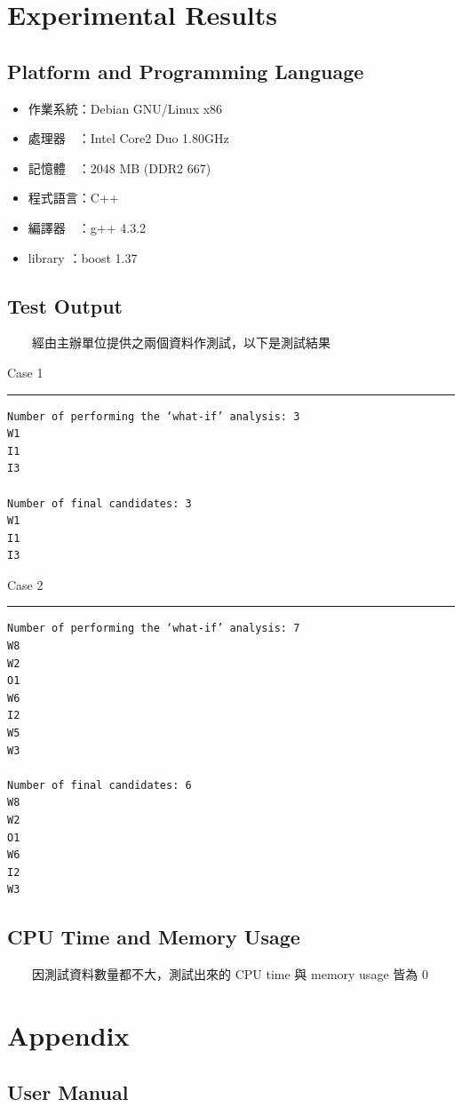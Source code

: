 \documentclass[12pt,a4paper]{article}
\begin{document}
\section{Experimental Results}

\subsection{Platform and Programming Language}

\begin{itemize}
\item 作業系統：Debian GNU/Linux x86
\item 處理器　：Intel Core2 Duo 1.80GHz
\item 記憶體　：2048 MB (DDR2 667)
\item 程式語言：C++
\item 編譯器　：g++ 4.3.2
\item library ：boost 1.37
\end{itemize}

\subsection{Test Output}

　　經由主辦單位提供之兩個資料作測試，以下是測試結果

Case 1
\hrule
\begin{verbatim}
Number of performing the ‘what-if’ analysis: 3
W1
I1
I3

Number of final candidates: 3
W1
I1
I3
\end{verbatim}

Case 2
\hrule
\begin{verbatim}
Number of performing the ‘what-if’ analysis: 7
W8
W2
O1
W6
I2
W5
W3

Number of final candidates: 6
W8
W2
O1
W6
I2
W3
\end{verbatim}

\subsection{CPU Time and Memory Usage}

　　因測試資料數量都不大，測試出來的 CPU time 與 memory usage 皆為 $0$

\section{Appendix}

\subsection{User Manual}
\end{document}
